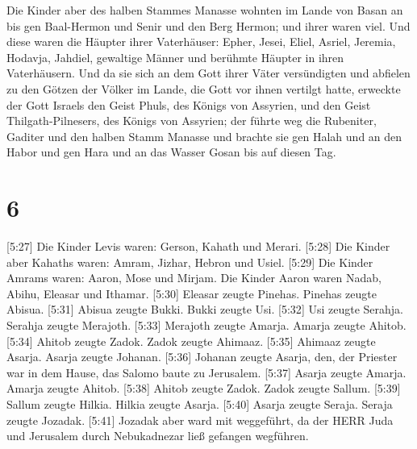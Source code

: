  Die Kinder aber des halben Stammes Manasse wohnten im
Lande von Basan an bis gen Baal-Hermon und Senir und den Berg Hermon;
und ihrer waren viel.  Und diese waren die Häupter ihrer
Vaterhäuser: Epher, Jesei, Eliel, Asriel, Jeremia, Hodavja, Jahdiel,
gewaltige Männer und berühmte Häupter in ihren Vaterhäusern.
 Und da sie sich an dem Gott ihrer Väter versündigten und
abfielen zu den Götzen der Völker im Lande, die Gott vor ihnen vertilgt
hatte,  erweckte der Gott Israels den Geist Phuls, des
Königs von Assyrien, und den Geist Thilgath-Pilnesers, des Königs von
Assyrien; der führte weg die Rubeniter, Gaditer und den halben Stamm
Manasse und brachte sie gen Halah und an den Habor und gen Hara und an
das Wasser Gosan bis auf diesen Tag.

\hypertarget{section-5}{%
\section{6}\label{section-5}}

 {[}5:27{]} Die Kinder Levis waren: Gerson, Kahath und
Merari.  {[}5:28{]} Die Kinder aber Kahaths waren: Amram,
Jizhar, Hebron und Usiel.  {[}5:29{]} Die Kinder Amrams
waren: Aaron, Mose und Mirjam. Die Kinder Aaron waren Nadab, Abihu,
Eleasar und Ithamar.  {[}5:30{]} Eleasar zeugte Pinehas.
Pinehas zeugte Abisua.  {[}5:31{]} Abisua zeugte Bukki.
Bukki zeugte Usi.  {[}5:32{]} Usi zeugte Serahja. Serahja
zeugte Merajoth.  {[}5:33{]} Merajoth zeugte Amarja. Amarja
zeugte Ahitob.  {[}5:34{]} Ahitob zeugte Zadok. Zadok zeugte
Ahimaaz.  {[}5:35{]} Ahimaaz zeugte Asarja. Asarja zeugte
Johanan.  {[}5:36{]} Johanan zeugte Asarja, den, der
Priester war in dem Hause, das Salomo baute zu Jerusalem. 
{[}5:37{]} Asarja zeugte Amarja. Amarja zeugte Ahitob. 
{[}5:38{]} Ahitob zeugte Zadok. Zadok zeugte Sallum. 
{[}5:39{]} Sallum zeugte Hilkia. Hilkia zeugte Asarja. 
{[}5:40{]} Asarja zeugte Seraja. Seraja zeugte Jozadak. 
{[}5:41{]} Jozadak aber ward mit weggeführt, da der HERR Juda und
Jerusalem durch Nebukadnezar ließ gefangen wegführen.

